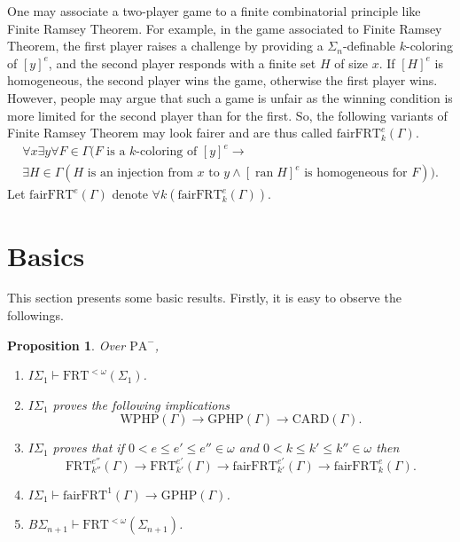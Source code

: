 \documentclass[twoside,a4paper]{amsart}
\newtheorem{proposition}[theorem]{Proposition}
\theoremstyle{definition}
\theoremstyle{theorem}
\numberwithin{equation}{section}
\newcommand{\<}{\langle}
\renewcommand{\>}{\rangle}
\newcommand{\ran}{\operatorname{ran}}
\newcommand{\PA}{\mathrm{PA}}
\newcommand{\CARD}{\mathrm{CARD}}
\newcommand{\WPHP}{\mathrm{WPHP}}
\newcommand{\GPHP}{\mathrm{GPHP}}
\newcommand{\FRT}{\mathrm{FRT}}
\newcommand{\fairFRT}{\mathrm{fairFRT}}
\begin{document}
One may associate a two-player game to a finite combinatorial principle like Finite Ramsey Theorem.
For example, in the game associated to Finite Ramsey Theorem,
the first player raises a challenge by providing a $\Sigma_n$-definable $k$-coloring of $[y]^e$,
and the second player responds with a finite set $H$ of size $x$.
If $[H]^e$ is homogeneous, the second player wins the game, otherwise the first player wins.
However, people may argue that such a game is unfair as the winning condition is more limited for the second player than for the first.
So, the following variants of Finite Ramsey Theorem may look fairer and are thus called $\fairFRT^e_k(\Gamma)$.
\begin{multline*}
  \forall x \exists y \forall F \in \Gamma (F \text{ is a } k \text{-coloring of } [y]^e \to \\
  \exists H \in \Gamma(H \text{ is an injection from } x \text{ to } y \wedge
   [\ran H]^e \text{ is homogeneous for } F)).  
\end{multline*}
Let $\fairFRT^e(\Gamma)$ denote $\forall k (\fairFRT^e_k(\Gamma))$.

\section{Basics}\label{s:Basics}

This section presents some basic results.
Firstly, it is easy to observe the followings.

\begin{proposition}
Over $\PA^-$,
\begin{enumerate}
  \item $I\Sigma_1 \vdash \FRT^{<\omega}(\Sigma_1)$.
  \item $I\Sigma_1$ proves the following implications
  \[
    \WPHP(\Gamma) \to \GPHP(\Gamma) \to \CARD(\Gamma).
  \]
  \item $I\Sigma_1$ proves that if $0 < e \leq e' \leq e'' \in \omega$ and $0 < k \leq k' \leq k'' \in \omega$ then 
  \[
    \FRT^{e''}_{k''}(\Gamma) \to \FRT^{e'}_{k'}(\Gamma) \to
    \fairFRT^{e'}_{k'}(\Gamma) \to \fairFRT^{e}_{k}(\Gamma).
  \]
  \item $I\Sigma_1 \vdash \fairFRT^{1}(\Gamma) \to \GPHP(\Gamma)$.
  \item $B\Sigma_{n+1} \vdash \FRT^{<\omega}(\Sigma_{n+1})$.
\end{enumerate}
\end{proposition}
\end{document}

